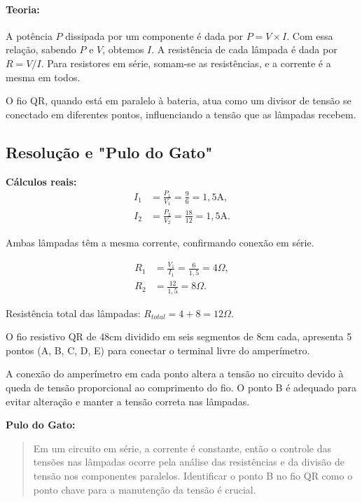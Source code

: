 \documentclass{article}
\begin{document}
\paragraph{Teoria:}
A potência $P$ dissipada por um componente é dada por $P=V \times I$. Com essa relação, sabendo $P$ e $V$, obtemos $I$. A resistência de cada lâmpada é dada por $R=V/I$. Para resistores em série, somam-se as resistências, e a corrente é a mesma em todos.

O fio QR, quando está em paralelo à bateria, atua como um divisor de tensão se conectado em diferentes pontos, influenciando a tensão que as lâmpadas recebem.

\subsection*{Resolução e "Pulo do Gato"}

\textbf{Cálculos reais:}
\begin{align*}
I_1 &= \frac{P_1}{V_1} = \frac{9}{6} = 1,5 \mathrm{A}, \\
I_2 &= \frac{P_2}{V_2} = \frac{18}{12} = 1,5 \mathrm{A}.
\end{align*}

\vspace{0.2cm}

Ambas lâmpadas têm a mesma corrente, confirmando conexão em série.

\begin{align*}
R_1 &= \frac{V_1}{I_1} = \frac{6}{1,5} = 4 \Omega, \\
R_2 &= \frac{12}{1,5} = 8 \Omega.
\end{align*}

\vspace{0.2cm}

Resistência total das lâmpadas: $R_{total} = 4 + 8 = 12 \Omega$.

\vspace{0.2cm}

O fio resistivo QR de $48 \mathrm{cm}$ dividido em seis segmentos de $8 \mathrm{cm}$ cada, apresenta 5 pontos (A, B, C, D, E) para conectar o terminal livre do amperímetro.

A conexão do amperímetro em cada ponto altera a tensão no circuito devido à queda de tensão proporcional ao comprimento do fio. O ponto B é adequado para evitar alteração e manter a tensão correta nas lâmpadas.

\textbf{Pulo do Gato:}
\begin{quote}
Em um circuito em série, a corrente é constante, então o controle das tensões nas lâmpadas ocorre pela análise das resistências e da divisão de tensão nos componentes paralelos. Identificar o ponto B no fio QR como o ponto chave para a manutenção da tensão é crucial.
\end{quote}
\end{document}
